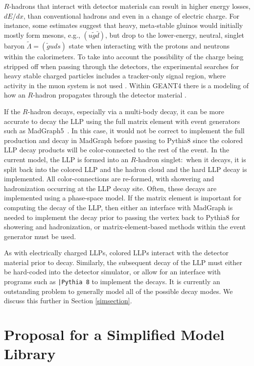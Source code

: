 $R$-hadrons that interact with detector materials can result in higher energy losses, $dE/dx$, than conventional hadrons and even in a change of electric charge.  For instance, some estimates \cite{Buccella:1985cs,Farrar:2010ps} suggest that heavy, meta-stable gluinos would initially mostly form mesons, e.g., $(u \tilde g \bar d)$, but drop to the lower-energy, neutral, singlet baryon $\tilde \Lambda = (\tilde g u d s)$ state when interacting with the protons and neutrons within the calorimeters.  To take into account the possibility of the charge being stripped off when passing through the detectors, the experimental searches for heavy stable charged particles includes a tracker-only signal region, where activity in the muon system is not used \cite{Aaboud:2016uth,CMS:2016ybj}.  Within GEANT4 \cite{Agostinelli:2002hh} there is a modeling of how an $R$-hadron propagates through the detector material \cite{Mackeprang:2009ad}.  

If the $R$-hadron decays, especially via a multi-body decay, it can be more accurate to decay the LLP using the full matrix element with event generators such as MadGraph5~\cite{Alwall:2011uj,Alwall:2014hca}. In this case, it would not be correct to implement the full production and decay in MadGraph before passing to Pythia8 since the colored LLP decay products will be color-connected to the rest of the event. In the current model, the LLP is formed into an $R$-hadron singlet:~when it decays, it is split back into the colored LLP and the hadron cloud and the hard LLP decay is implemented. All color-connections are re-formed, with showering and hadronization occurring at the LLP decay site. Often, these decays are implemented using a phase-space model. If the matrix element is important for computing the decay of the LLP, then either an interface with MadGraph is needed to implement the decay prior to passing the vertex back to Pythia8 for showering and hadronization, or matrix-element-based methods within the event generator must be used.

As with electrically charged LLPs, colored LLPs interact with the detector material prior to decay. Similarly, the subsequent decay of the LLP must either be hard-coded into the detector simulator, or allow for an interface with programs such as \texttt{|Pythia 8} to implement the decays. It is currently an outstanding problem to generally model all of the possible decay modes. We discuss this further in Section \ref{simsection}.

\section{Proposal for a Simplified Model Library}\label{sec:library}

